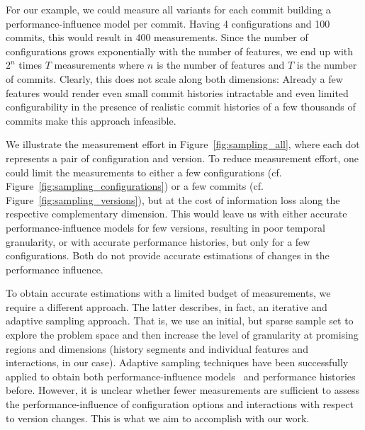 \documentclass[sigconf]{acmart}
\begin{document}
	For our example, we could measure all variants for each commit building a performance-influence model per commit.
	Having 4 configurations and 100 commits, this would result in 400 measurements.
	Since the number of configurations grows exponentially with the number of features, we end up with $2^n$ times $T$ measurements where $n$ is the number of features and $T$ is the number of commits.
	Clearly, this does not scale along both dimensions: Already a few features would render even small commit histories intractable and even limited configurability in the presence of realistic commit histories of a few thousands of commits make this approach infeasible.

	We illustrate the measurement effort in Figure~\ref{fig:sampling_all}, where each dot represents a pair of configuration and version.
	To reduce measurement effort, one could limit the measurements to either a few configurations (cf. Figure~\ref{fig:sampling_configurations}) or a few commits (cf. Figure~\ref{fig:sampling_versions}), but at the cost of information loss along the respective complementary dimension.
	This would leave us with either accurate performance-influence models for few versions, resulting in poor temporal granularity, or with accurate performance histories, but only for a few configurations.
	Both do not provide accurate estimations of changes in the performance influence.

	To obtain accurate estimations with a limited budget of measurements, we require a different approach. 
	The latter describes, in fact, an iterative and adaptive sampling approach.
	That is, we use an initial, but sparse sample set to explore the problem space and then increase the level of granularity at promising regions and dimensions (history segments and individual features and interactions, in our case).
	Adaptive sampling techniques have been successfully applied to  obtain both performance-influence models~\cite{siegmundPredictingPerformanceAutomated2012,sarkarCostEfficientSamplingPerformance} and performance histories~\cite{muhlbauer_accurate_2019} before.
	However, it is unclear whether fewer measurements are sufficient to assess the performance-influence of configuration options and interactions with respect to version changes. This is what we aim to accomplish with our work.
\end{document}
